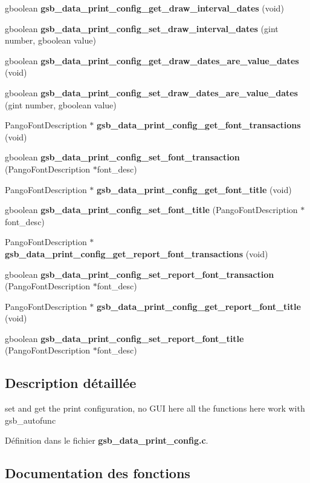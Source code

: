 \begin{DoxyCompactItemize}
\item 
gboolean {\bf gsb\_\-data\_\-print\_\-config\_\-get\_\-draw\_\-interval\_\-dates} (void)
\item 
gboolean {\bf gsb\_\-data\_\-print\_\-config\_\-set\_\-draw\_\-interval\_\-dates} (gint number, gboolean value)
\item 
gboolean {\bf gsb\_\-data\_\-print\_\-config\_\-get\_\-draw\_\-dates\_\-are\_\-value\_\-dates} (void)
\item 
gboolean {\bf gsb\_\-data\_\-print\_\-config\_\-set\_\-draw\_\-dates\_\-are\_\-value\_\-dates} (gint number, gboolean value)
\item 
PangoFontDescription $\ast$ {\bf gsb\_\-data\_\-print\_\-config\_\-get\_\-font\_\-transactions} (void)
\item 
gboolean {\bf gsb\_\-data\_\-print\_\-config\_\-set\_\-font\_\-transaction} (PangoFontDescription $\ast$font\_\-desc)
\item 
PangoFontDescription $\ast$ {\bf gsb\_\-data\_\-print\_\-config\_\-get\_\-font\_\-title} (void)
\item 
gboolean {\bf gsb\_\-data\_\-print\_\-config\_\-set\_\-font\_\-title} (PangoFontDescription $\ast$font\_\-desc)
\item 
PangoFontDescription $\ast$ {\bf gsb\_\-data\_\-print\_\-config\_\-get\_\-report\_\-font\_\-transactions} (void)
\item 
gboolean {\bf gsb\_\-data\_\-print\_\-config\_\-set\_\-report\_\-font\_\-transaction} (PangoFontDescription $\ast$font\_\-desc)
\item 
PangoFontDescription $\ast$ {\bf gsb\_\-data\_\-print\_\-config\_\-get\_\-report\_\-font\_\-title} (void)
\item 
gboolean {\bf gsb\_\-data\_\-print\_\-config\_\-set\_\-report\_\-font\_\-title} (PangoFontDescription $\ast$font\_\-desc)
\end{DoxyCompactItemize}


\subsection{Description détaillée}
set and get the print configuration, no GUI here all the functions here work with gsb\_\-autofunc 

Définition dans le fichier {\bf gsb\_\-data\_\-print\_\-config.c}.



\subsection{Documentation des fonctions}
